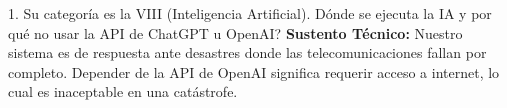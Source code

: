\documentclass[10pt,letterpaper]{article}
\begin{document}
\begin{killerbox}{1. Su categoría es la VIII (Inteligencia Artificial). \textquestiondown Dónde se ejecuta la IA y por qué no usar la API de ChatGPT u OpenAI?}
\small\textbf{Sustento Técnico:} Nuestro sistema es de respuesta ante desastres donde las telecomunicaciones fallan por completo. Depender de la API de OpenAI significa requerir acceso a internet, lo cual es inaceptable en una catástrofe.
\end{killerbox}
\end{document}
